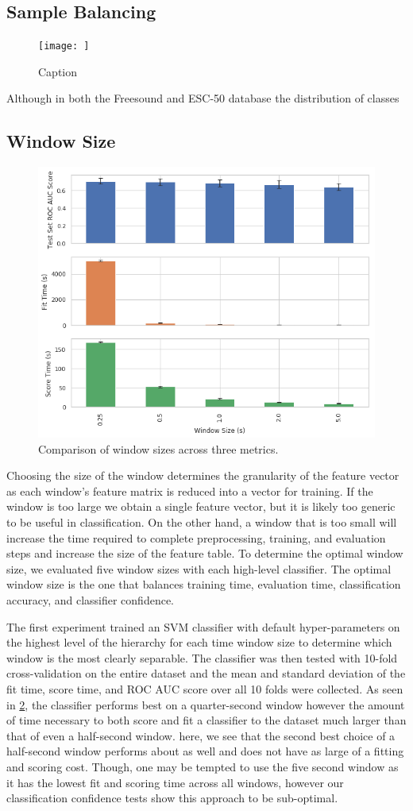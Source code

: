 \subsection{Sample Balancing}
\begin{figure}[h]
    \centering
    \texttt{[image: ]}
    \caption{Caption}
    \label{fig:my_label}
\end{figure}
Although in both the Freesound and ESC-50 database the distribution of classes

\subsection{Window Size}

\begin{figure}[h]
    \centering
    \includegraphics[width=.48\textwidth]{figures/ROC-AUC-Window-Compare.png}
    \caption{Comparison of window sizes across three metrics.}
    \label{fig:roc-auc-window}
\end{figure}

Choosing the size of the window determines the granularity of the feature vector as each window's feature matrix is reduced into a vector for training. If the window is too large we obtain a single feature vector, but it is likely too generic to be useful in classification. On the other hand, a window that is too small will increase the time required to complete preprocessing, training, and evaluation steps and increase the size of the feature table. To determine the optimal window size, we evaluated five window sizes with each high-level classifier. The optimal window size is the one that balances training time, evaluation time, classification accuracy, and classifier confidence.

The first experiment trained an SVM classifier with default hyper-parameters on the highest level of the hierarchy for each time window size to determine which window is the most clearly separable. The classifier was then tested with 10-fold cross-validation on the entire dataset and the mean and standard deviation of the fit time, score time, and ROC AUC score over all 10 folds were collected. As seen in \cref{fig:roc-auc-window}, the classifier performs best on a quarter-second window however the amount of time necessary to both score and fit a classifier to the dataset much larger than that of even a half-second window. here, we see that the second best choice of a half-second window performs about as well and does not have as large of a fitting and scoring cost. Though, one may be tempted to use the five second window as it has the lowest fit and scoring time across all windows, however our classification confidence tests show this approach to be sub-optimal.

